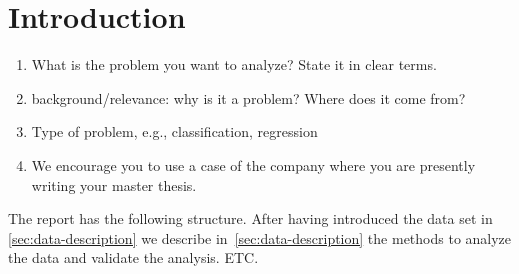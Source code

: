 \documentclass[report]{subfiles}
\begin{document}
\section{Introduction}
\label{sec:introduction}

\begin{enumerate}
\item What is the  problem you want to analyze? State it in clear terms.
\item background/relevance: why is it a problem? Where does it come from?
\item Type of problem, e.g., classification, regression
\item We encourage you to use a case of the company where you are presently writing your master thesis.
\end{enumerate}

The report has the following structure. After having introduced the data set in  \cref{sec:data-description} we describe in~\cref{sec:data-description} the methods to analyze the data and validate the analysis. ETC.
\end{document}
